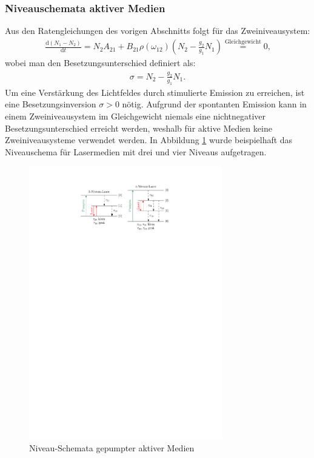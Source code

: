 \documentclass[11pt, a4paper]{article}
\numberwithin{equation}{section}
\begin{document}
\subsubsection{Niveauschemata aktiver Medien}
Aus den Ratengleichungen des vorigen Abschnitts folgt für das Zweiniveausystem:
\begin{align}
	\frac{\mathrm{d}(N_1 - N_2)}{\mathrm{d} t} = N_2 A_{21} + B_{21} \rho(\omega_{12}) \left( N_2 - \frac{g_2}{g_1} N_1 \right) \stackrel{\mathrm{Gleichgewicht}}{=} 0 \text{,}
\end{align}
wobei man den Besetzungsunterschied definiert als:
\begin{align}
	\sigma = N_2 - \frac{g_2}{g_1} N_1 \text{.}
\end{align}
Um eine Verstärkung des Lichtfeldes durch stimulierte Emission zu erreichen, ist eine Besetzungsinversion $\sigma > 0$ nötig.
Aufgrund der spontanten Emission kann in einem Zweiniveausystem im Gleichgewicht niemals eine nichtnegativer Besetzungsunterschied erreicht werden, weshalb für aktive Medien keine Zweiniveausysteme verwendet werden.
In Abbildung \ref{fig:niveauschema} wurde beispielhaft das Niveauschema für Lasermedien mit drei und vier Niveaus aufgetragen.
\begin{figure}[h]
	\centering
	\includegraphics[width=0.75\textwidth]{./figures/niveausystem_3_4.pdf}
	\caption{Niveau-Schemata gepumpter aktiver Medien}
	\label{fig:niveauschema}
\end{figure}
\end{document}
